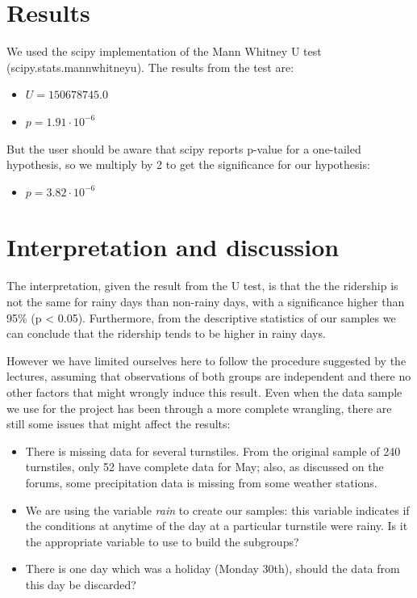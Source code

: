 \documentclass[a4paper,12pt,english]{sphinxmanual}
\begin{document}
\section{Results}
\label{section1:results}
We used the scipy implementation of the Mann Whitney U test
(scipy.stats.mannwhitneyu). The results from the test are:
\begin{itemize}
\item {} 
\(U = 150678745.0\)

\item {} 
\(p = 1.91 \cdot 10^{-6}\)

\end{itemize}

But the user should be aware that scipy reports p-value for a one-tailed
hypothesis, so we multiply by 2 to get the significance for our hypothesis:
\begin{itemize}
\item {} 
\(p = 3.82 \cdot 10^{-6}\)

\end{itemize}


\section{Interpretation and discussion}
\label{section1:interpretation-and-discussion}
The interpretation, given the result from the U test, is that the the ridership
is not the same for rainy days than non-rainy days, with a significance higher
than 95\% (p \textless{} 0.05). Furthermore, from the descriptive statistics of our samples
we can conclude that the ridership tends to be higher in rainy days.

However we have limited ourselves here to follow the procedure suggested by the
lectures, assuming that observations of both groups are independent and there
no other factors that might wrongly induce this result. Even when the data sample
we use for the project has been through a more complete wrangling, there are
still some issues that might affect the results:
\begin{itemize}
\item {} 
There is missing data for several turnstiles. From the original sample of 240
turnstiles, only 52 have complete data for May; also, as discussed on the forums,
some precipitation data is missing from some weather stations.

\item {} 
We are using the variable \emph{rain} to create our samples: this variable
indicates if the conditions at anytime of the day at a
particular turnstile were rainy. Is it the appropriate variable to use to
build the subgroups?

\item {} 
There is one day which was a holiday (Monday 30th), should the data from this
day be discarded?

\end{itemize}
\end{document}
